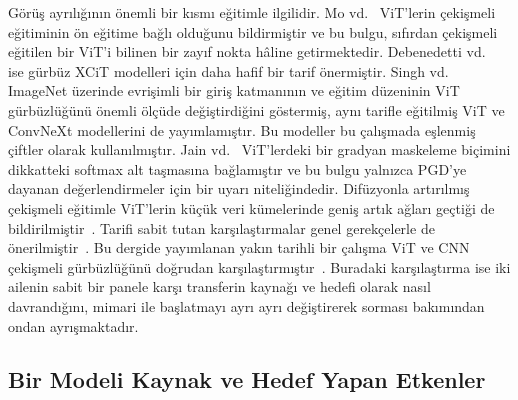 Görüş ayrılığının önemli bir kısmı eğitimle ilgilidir. Mo vd.~\cite{mo2022adversarial} ViT'lerin çekişmeli eğitiminin ön eğitime bağlı olduğunu bildirmiştir ve bu bulgu, sıfırdan çekişmeli eğitilen bir ViT'i bilinen bir zayıf nokta hâline getirmektedir. Debenedetti vd.~\cite{debenedetti2023light} ise gürbüz XCiT modelleri için daha hafif bir tarif önermiştir. Singh vd.~\cite{singh2023revisiting} ImageNet üzerinde evrişimli bir giriş katmanının ve eğitim düzeninin ViT gürbüzlüğünü önemli ölçüde değiştirdiğini göstermiş, aynı tarifle eğitilmiş ViT ve ConvNeXt modellerini de yayımlamıştır. Bu modeller bu çalışmada eşlenmiş çiftler olarak kullanılmıştır. Jain vd.~\cite{jain2024towards} ViT'lerdeki bir gradyan maskeleme biçimini dikkatteki softmax alt taşmasına bağlamıştır ve bu bulgu yalnızca PGD'ye dayanan değerlendirmeler için bir uyarı niteliğindedir. Difüzyonla artırılmış çekişmeli eğitimle ViT'lerin küçük veri kümelerinde geniş artık ağları geçtiği de bildirilmiştir~\cite{wu2025vision}. Tarifi sabit tutan karşılaştırmalar genel gerekçelerle de önerilmiştir~\cite{pinto2022impartial}. Bu dergide yayımlanan yakın tarihli bir çalışma ViT ve CNN çekişmeli gürbüzlüğünü doğrudan karşılaştırmıştır~\cite{ali2024adversarial}. Buradaki karşılaştırma ise iki ailenin sabit bir panele karşı transferin kaynağı ve hedefi olarak nasıl davrandığını, mimari ile başlatmayı ayrı ayrı değiştirerek sorması bakımından ondan ayrışmaktadır.

\subsection{Bir Modeli Kaynak ve Hedef Yapan Etkenler}
\label{subsec:rw_transfer}

